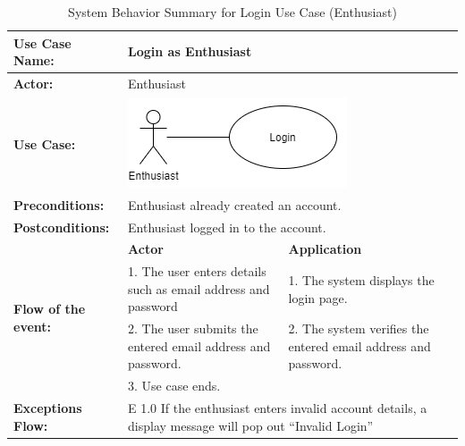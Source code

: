 \begin{longtable}{|p{3cm}|p{5cm}|p{5cm}|}
    \caption{System Behavior Summary for Login Use Case (Enthusiast)} \\
    \hline
    \textbf{Use Case Name:} & \multicolumn{2}{l|}{Login as Enthusiast} \\ \hline
    \textbf{Actor:} & \multicolumn{2}{l|}{Enthusiast} \\ \hline
    \textbf{Use Case:} & \multicolumn{2}{l|}{\includegraphics[width=0.5\linewidth]{mainmatter/images/sucd8.png}} \\ \hline
    \textbf{Preconditions:} & \multicolumn{2}{p{10cm}|}{Enthusiast already created an account.} \\ \hline
    \textbf{Postconditions:} & \multicolumn{2}{p{10cm}|}{Enthusiast logged in to the account.} \\ \hline
    \multirow{4}{3cm}{\raggedright \textbf{Flow of the event:}} & \textbf{Actor} & \textbf{Application} \\ \cline{2-3}
    & 1. The user enters details such as email address and password & 1. The system displays the login page. \\ \cline{2-3}
    & 2. The user submits the entered email address and password. & 2. The system verifies the entered email address and password. \\ \cline{2-3}
    & 3. Use case ends. & \\ \hline
    \multirow{1}{3cm}{\raggedright \textbf{Exceptions Flow:}} 
    & \multicolumn{2}{p{10cm}|}{\raggedright E 1.0 If the enthusiast enters invalid account details, a display message will pop out “Invalid Login”} \\ \hline
\end{longtable}
\pagebreak


